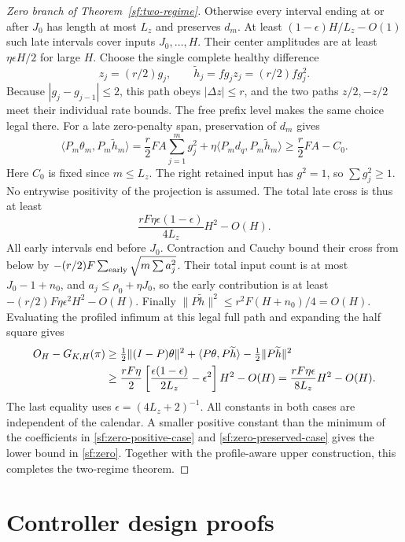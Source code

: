 \documentclass[journal]{IEEEtran}
\begin{document}
\begin{proof}[Zero branch of Theorem~\ref{sf:two-regime}]
Otherwise every interval ending at or after $J_0$ has length
at most $L_z$ and preserves $d_m$.
At least $(1-\epsilon)H/L_z-O(1)$ such late intervals cover
inputs $J_0,\ldots,H$. Their center amplitudes are at least
$\eta\epsilon H/2$ for large $H$.
Choose the single complete healthy difference
\[
z_j=(r/2)g_j,\qquad \widetilde h_j=fg_jz_j=(r/2)fg_j^2 .
\]
Because $|g_j-g_{j-1}|\le2$, this path obeys $|\Delta z|\le r$,
and the two paths $z/2,-z/2$ meet their individual rate bounds.
The free prefix level makes the same choice legal there.
For a late zero-penalty span, preservation of $d_m$ gives
\[
\langle P_m\theta_m,P_m\widetilde h_m\rangle
=\frac r2FA\sum_{j=1}^m g_j^2+
 \eta\langle P_md_q,P_m\widetilde h_m\rangle
\ge \frac r2FA-C_0 .
\]
Here $C_0$ is fixed since $m\le L_z$.
The right retained input has $g^2=1$, so $\sum g_j^2\ge1$.
No entrywise positivity of the projection is assumed.
The total late cross is thus at least
\[
\frac{rF\eta\epsilon(1-\epsilon)}{4L_z}H^2-O(H).
\]
All early intervals end before $J_0$.
Contraction and Cauchy bound their cross from below by
$-(r/2)F\sum_{\rm early}\sqrt{m\sum a_j^2}$.
Their total input count is at most $J_0-1+n_0$, and
$a_j\le\rho_0+\eta J_0$, so the early contribution is at least
$-(r/2)F\eta\epsilon^2H^2-O(H)$.
Finally $\|P\widetilde h\|^2\le r^2F(H+n_0)/4=O(H)$.
Evaluating the profiled infimum at this legal full path and expanding
the half square gives
\begin{align}
O_H-G_{K,H}(\pi)
&\ge \tfrac12\|(I-P)\theta\|^2+
 \langle P\theta,P\widetilde h\rangle-
 \tfrac12\|P\widetilde h\|^2 \notag\\
&\ge \frac{rF\eta}{2}
 \left[\frac{\epsilon(1-\epsilon)}{2L_z}-\epsilon^2\right]H^2-O(H)
 =\frac{rF\eta\epsilon}{8L_z}H^2-O(H).
\label{sf:zero-preserved-case}
\end{align}
The last equality uses $\epsilon=(4L_z+2)^{-1}$.
All constants in both cases are independent of the calendar.
A smaller positive constant than the minimum of the coefficients
in \eqref{sf:zero-positive-case} and \eqref{sf:zero-preserved-case}
gives the lower bound in \eqref{sf:zero}.
Together with the profile-aware upper construction, this completes
the two-regime theorem.
\end{proof}

\section{Controller design proofs}\label{sf:control-proofs}
\end{document}
